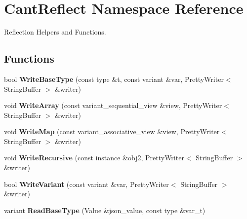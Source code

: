 \hypertarget{namespaceCantReflect}{}\section{Cant\+Reflect Namespace Reference}
\label{namespaceCantReflect}


Reflection Helpers and Functions.  


\subsection*{Functions}
\begin{DoxyCompactItemize}
\item 
\mbox{\label{namespaceCantReflect_a6f5300608727b106c9e63994f7990a9a}} 
bool {\bfseries Write\+Base\+Type} (const type \&t, const variant \&var, Pretty\+Writer$<$ String\+Buffer $>$ \&writer)
\item 
\mbox{\label{namespaceCantReflect_a0cff3a65f99e0441e842cebcc6933399}} 
void {\bfseries Write\+Array} (const variant\+\_\+sequential\+\_\+view \&view, Pretty\+Writer$<$ String\+Buffer $>$ \&writer)
\item 
\mbox{\label{namespaceCantReflect_a314f7963e3d0f6cc249e2ed1629b2d62}} 
void {\bfseries Write\+Map} (const variant\+\_\+associative\+\_\+view \&view, Pretty\+Writer$<$ String\+Buffer $>$ \&writer)
\item 
\mbox{\label{namespaceCantReflect_ab7b21b9d406f248fb2fe3a3f6b93db50}} 
void {\bfseries Write\+Recursive} (const instance \&obj2, Pretty\+Writer$<$ String\+Buffer $>$ \&writer)
\item 
\mbox{\label{namespaceCantReflect_a657ad95b2aa2d7e86d52a229a7c5b48f}} 
bool {\bfseries Write\+Variant} (const variant \&var, Pretty\+Writer$<$ String\+Buffer $>$ \&writer)
\item 
\mbox{\label{namespaceCantReflect_a286a765f077d80e1e49b7a9f1477cae1}} 
variant {\bfseries Read\+Base\+Type} (Value \&json\+\_\+value, const type \&var\+\_\+t)
\item 
\mbox{\label{namespaceCantReflect_a15f83c05d500935bbda67efaf17cba45}} 

\end{DoxyCompactItemize}
